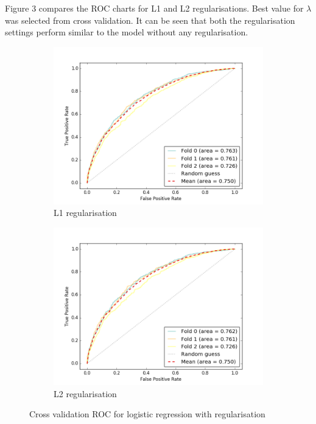 \documentclass[paper=a4,fontsize=12pt]{article}
\begin{document}
Figure 3 compares the ROC charts for L1 and L2 regularisations. Best value for $\lambda$ was selected from cross validation. It can be seen that both the regularisation settings perform similar to the model without any regularisation.


\begin{figure}[H]
\centering
\begin{subfigure}{.5\textwidth}
  \centering
  \includegraphics[width=1\linewidth]{01_L1regularisation_of}
  \caption{L1 regularisation}
  \label{fig:sub1}
\end{subfigure}%
\begin{subfigure}{.5\textwidth}
  \centering
  \includegraphics[width=1\linewidth]{02_L2regularisation_of}
  \caption{L2 regularisation}
  \label{fig:sub2}
\end{subfigure}
\caption{Cross validation ROC for logistic regression with regularisation}
\label{fig:test}
\end{figure}
\end{document}
